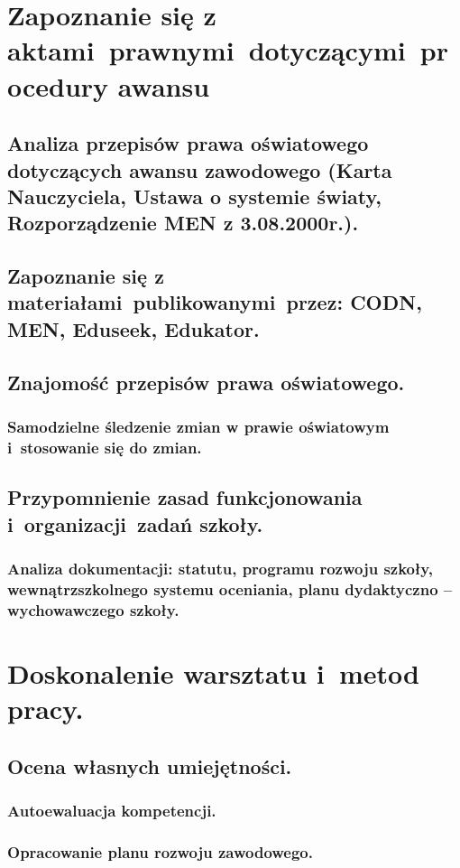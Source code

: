 \documentclass[a4paper,titlepage,13pt,draft]{mwart}
\begin{document}
\begin{flushleft}
\section{Zapoznanie się z aktami~prawnymi~dotyczącymi~procedury awansu}
\subsection{Analiza przepisów prawa oświatowego dotyczących awansu zawodowego (Karta Nauczyciela, Ustawa o systemie światy, Rozporządzenie MEN z 3.08.2000r.).}
\subsection{Zapoznanie się z materiałami~publikowanymi~przez: CODN, MEN, Eduseek, Edukator.}
\subsection{Znajomość przepisów prawa oświatowego.}
\subsubsection{Samodzielne śledzenie zmian w prawie oświatowym i~stosowanie się do zmian.}
\subsection{Przypomnienie zasad funkcjonowania i~organizacji~zadań szkoły.}
\subsubsection{Analiza dokumentacji: statutu, programu rozwoju szkoły, wewnątrzszkolnego systemu oceniania, planu dydaktyczno – wychowawczego szkoły.}
\section{Doskonalenie warsztatu i~metod pracy.} \label{doskonalenie}
\subsection{Ocena własnych umiejętności.}
\subsubsection{Autoewaluacja kompetencji.}
\subsubsection{Opracowanie planu rozwoju zawodowego.}

\end{flushleft}
\end{document}
